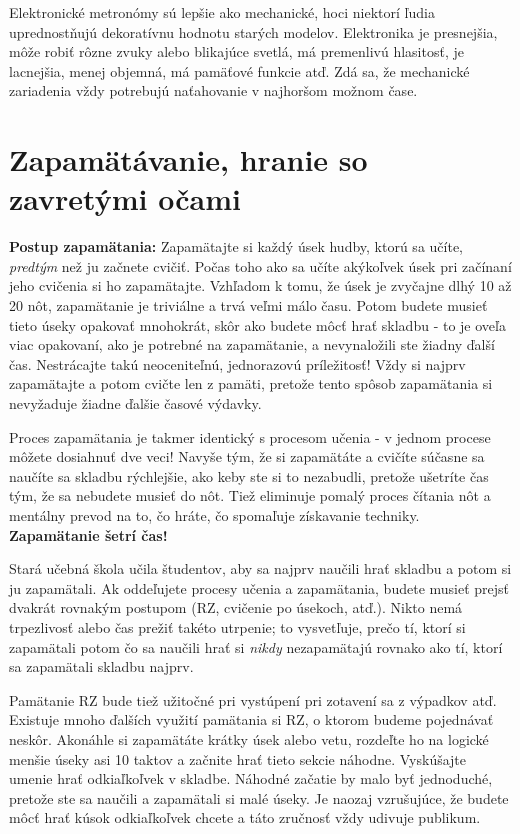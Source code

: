 \documentclass[11pt,a4paper]{book}
\begin{document}
Elektronické metronómy sú lepšie ako mechanické, hoci niektorí ľudia uprednostňujú dekoratívnu hodnotu starých modelov. Elektronika je presnejšia, môže robiť rôzne zvuky alebo blikajúce svetlá, má premenlivú hlasitosť, je lacnejšia, menej objemná, má pamäťové funkcie atď. Zdá sa, že mechanické zariadenia vždy potrebujú naťahovanie v najhoršom možnom čase.

\section{Zapamätávanie, hranie so zavretými očami}\label{s:memorizing}
\textbf{Postup zapamätania:} Zapamätajte si každý úsek hudby, ktorú sa učíte, \emph{predtým} než ju začnete cvičiť. Počas toho ako sa učíte akýkoľvek úsek pri začínaní jeho cvičenia si ho zapamätajte. Vzhľadom k tomu, že úsek je zvyčajne dlhý 10 až 20 nôt, zapamätanie je triviálne a trvá veľmi málo času. Potom budete musieť tieto úseky opakovať mnohokrát, skôr ako budete môcť hrať skladbu - to je oveľa viac opakovaní, ako je potrebné na zapamätanie, a nevynaložili ste žiadny ďalší čas. Nestrácajte takú neoceniteľnú, jednorazovú príležitosť! Vždy si najprv zapamätajte a potom cvičte len z pamäti, pretože tento spôsob zapamätania si nevyžaduje žiadne ďalšie časové výdavky.

Proces zapamätania je takmer identický s procesom učenia - v jednom procese môžete dosiahnuť dve veci! Navyše tým, že si zapamätáte a cvičíte súčasne sa naučíte sa skladbu rýchlejšie, ako keby ste si to nezabudli, pretože ušetríte čas tým, že sa nebudete musieť do nôt. Tiež eliminuje pomalý proces čítania nôt a mentálny prevod na to, čo hráte, čo spomaľuje získavanie techniky. \textbf{Zapamätanie šetrí čas!}

Stará učebná škola učila študentov, aby sa najprv naučili hrať skladbu a potom si ju zapamätali. Ak oddeľujete procesy učenia a zapamätania, budete musieť prejsť dvakrát rovnakým postupom (RZ, cvičenie po úsekoch, atď.). Nikto nemá trpezlivosť alebo čas prežiť takéto utrpenie; to vysvetľuje, prečo tí, ktorí si zapamätali potom  čo sa naučili hrať si \emph{nikdy} nezapamätajú rovnako ako tí, ktorí sa zapamätali skladbu najprv.

Pamätanie RZ bude tiež užitočné pri vystúpení pri zotavení sa z výpadkov atď. Existuje mnoho ďalších využití pamätania si RZ, o ktorom budeme pojednávať neskôr. Akonáhle si zapamätáte krátky úsek alebo vetu, rozdeľte ho na logické menšie úseky asi 10 taktov a začnite hrať tieto sekcie náhodne. Vyskúšajte umenie hrať odkiaľkoľvek v skladbe. Náhodné začatie by malo byť jednoduché, pretože ste sa naučili a zapamätali si malé úseky. Je naozaj vzrušujúce, že budete môcť hrať kúsok odkiaľkoľvek chcete a táto zručnosť vždy udivuje publikum.
\end{document}
